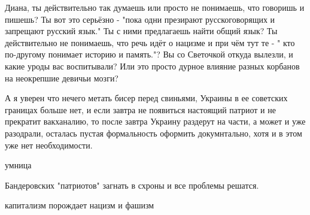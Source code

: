 \begin{itemize}
Диана, ты действительно так думаешь или просто не понимаешь, что говоришь и
пишешь? Ты вот это серьёзно - "пока одни презирают русскоговорящих и запрещают
русский язык." Ты с ними предлагаешь найти общий язык? Ты действительно не
понимаешь, что речь идёт о нацизме и при чём тут те - " кто по-другому понимает
историю и память."? Вы со Светочкой откуда вылезли, и какие уроды вас
воспитывали? Или это просто дурное влияние разных корбанов на неокрепшие
девичьи мозги?

 

А я уверен что нечего метать бисер перед свиньями, Украины в ее советских
границах больше нет, и если завтра не появиться настоящий патриот и не
прекратит вакханалию, то после завтра Украину раздерут на части, а может и уже
разодрали, осталась пустая формальность оформить докумнтально, хотя и в этом
уже нет необходимости.


 
умница

 
Бандеровских "патриотов" загнать в схроны и все проблемы решатся.

 
капитализм порождает нацизм и фашизм

 

\end{itemize}
